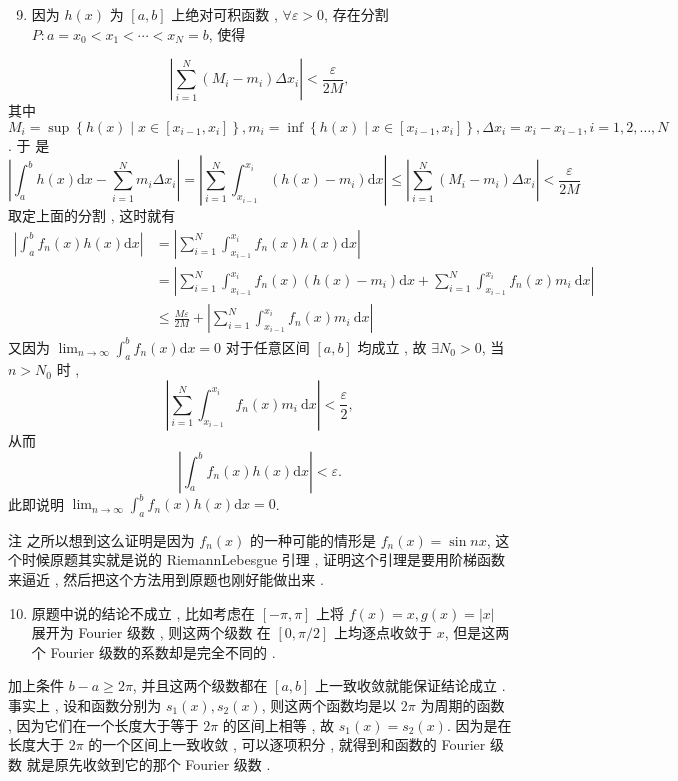 \documentclass[10pt]{article}
\begin{document}
\begin{enumerate}
  \setcounter{enumi}{8}
  \item  因为  $h(x)$  为  $[a, b]$  上绝对可积函数 , $\forall \varepsilon>0$,  存在分割  $P: a=x_{0}<x_{1}<\cdots<x_{N}=b$,  使得 
\end{enumerate}
$$
\left|\sum_{i=1}^{N}\left(M_{i}-m_{i}\right) \Delta x_{i}\right|<\frac{\varepsilon}{2 M},
$$
 其中  $M_{i}=\sup \left\{h(x) \mid x \in\left[x_{i-1}, x_{i}\right]\right\}, m_{i}=\inf \left\{h(x) \mid x \in\left[x_{i-1}, x_{i}\right]\right\}, \Delta x_{i}=x_{i}-x_{i-1}, i=1,2, \ldots, N$.  于   是 
$$
\left|\int_{a}^{b} h(x) \mathrm{d} x-\sum_{i=1}^{N} m_{i} \Delta x_{i}\right|=\left|\sum_{i=1}^{N} \int_{x_{i-1}}^{x_{i}}\left(h(x)-m_{i}\right) \mathrm{d} x\right| \leqslant\left|\sum_{i=1}^{N}\left(M_{i}-m_{i}\right) \Delta x_{i}\right|<\frac{\varepsilon}{2 M}
$$
 取定上面的分割 ,  这时就有 
$$
\begin{aligned}
\left|\int_{a}^{b} f_{n}(x) h(x) \mathrm{d} x\right| &=\left|\sum_{i=1}^{N} \int_{x_{i-1}}^{x_{i}} f_{n}(x) h(x) \mathrm{d} x\right| \\
&=\left|\sum_{i=1}^{N} \int_{x_{i-1}}^{x_{i}} f_{n}(x)\left(h(x)-m_{i}\right) \mathrm{d} x+\sum_{i=1}^{N} \int_{x_{i-1}}^{x_{i}} f_{n}(x) m_{i} \mathrm{~d} x\right| \\
& \leqslant \frac{M \varepsilon}{2 M}+\left|\sum_{i=1}^{N} \int_{x_{i-1}}^{x_{i}} f_{n}(x) m_{i} \mathrm{~d} x\right|
\end{aligned}
$$
 又因为  $\lim _{n \rightarrow \infty} \int_{a}^{b} f_{n}(x) \mathrm{d} x=0$  对于任意区间  $[a, b]$  均成立 ,  故  $\exists N_{0}>0$,  当  $n>N_{0}$  时 ,
$$
\left|\sum_{i=1}^{N} \int_{x_{i-1}}^{x_{i}} f_{n}(x) m_{i} \mathrm{~d} x\right|<\frac{\varepsilon}{2},
$$
 从而 
$$
\left|\int_{a}^{b} f_{n}(x) h(x) \mathrm{d} x\right|<\varepsilon .
$$
 此即说明  $\lim _{n \rightarrow \infty} \int_{a}^{b} f_{n}(x) h(x) \mathrm{d} x=0$.

 注   之所以想到这么证明是因为  $f_{n}(x)$  的一种可能的情形是  $f_{n}(x)=\sin n x$,  这个时候原题其实就是说的  RiemannLebesgue  引理 ,  证明这个引理是要用阶梯函数来逼近 ,  然后把这个方法用到原题也刚好能做出来 .

\begin{enumerate}
  \setcounter{enumi}{9}
  \item  原题中说的结论不成立 ,  比如考虑在  $[-\pi, \pi]$  上将  $f(x)=x, g(x)=|x|$  展开为  Fourier  级数 ,  则这两个级数   在  $[0, \pi / 2]$  上均逐点收敛于  $x$,  但是这两个  Fourier  级数的系数却是完全不同的 .
\end{enumerate}
 加上条件  $b-a \geqslant 2 \pi$,  并且这两个级数都在  $[a, b]$  上一致收敛就能保证结论成立 .  事实上 ,  设和函数分别为  $s_{1}(x), s_{2}(x)$,  则这两个函数均是以  $2 \pi$  为周期的函数 ,  因为它们在一个长度大于等于  $2 \pi$  的区间上相等 ,  故  $s_{1}(x)=s_{2}(x)$.  因为是在长度大于  $2 \pi$  的一个区间上一致收敛 ,  可以逐项积分 ,  就得到和函数的  Fourier  级数   就是原先收敛到它的那个  Fourier  级数 .
\end{document}
